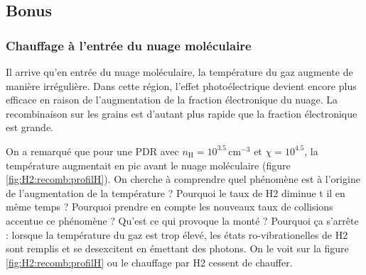 
\subsection{Bonus}
\subsubsection{Chauffage à l'entrée du nuage moléculaire}

Il arrive qu'en entrée du nuage moléculaire, la température du gaz augmente de manière irrégulière. Dans cette région, l'effet photoélectrique devient encore plus efficace en raison de l'augmentation de la fraction électronique du nuage. La recombinaison sur les grains est d'autant plus rapide que la fraction électronique est grande. 






On a remarqué que pour une PDR avec $n_\mathrm{H} = 10^{3.5} \, \mathrm{cm}^{-3}$ et $\chi = 10^{4.5}$, la température augmentait en pic avant le nuage moléculaire (figure \ref{fig:H2:recomb:profilH}). On cherche à comprendre quel phénomène est à l'origine de l'augmentation de la température ? Pourquoi le taux de H2 diminue t il en même temps ? Pourquoi prendre en compte les nouveaux taux de collisions accentue ce phénomène ? Qu'est ce qui provoque la monté ? Pourquoi ça s'arrête : lorsque la température du gaz est trop élevé, les états ro-vibrationelles de H2 sont remplis et se desexcitent en émettant des photons. On le voit sur la figure \ref{fig:H2:recomb:profilH} ou le chauffage par H2 cessent de chauffer.

